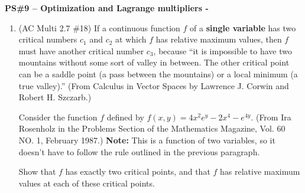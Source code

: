 \documentclass[10pt]{article}
\renewcommand{\section}[1]{\begin{center} \textbf{#1} \\\end{center}}
\begin{document}
%


\allowdisplaybreaks
\section{PS\#9 -- Optimization and Lagrange multipliers - \red{Answer key} }

\begin{enumerate}[leftmargin=0pt]
    
    \item (AC Multi 2.7 \#18) If a continuous function $f$ of a \textbf{single variable} has two critical numbers $c_1$ and $c_2$ at which $f$ has relative maximum values, then $f$ must have another critical number $c_3$, because ``it is impossible to have two mountains without some sort of valley in between. The other critical point can be a saddle point (a pass between the mountains) or a local minimum (a true valley).'' (From Calculus in Vector Spaces by Lawrence J. Corwin and Robert H. Szczarb.)
    
    Consider the function $f$ defined by $f(x,y) = 4x^2e^y -2x^4 -e^{4y}.$ (From Ira Rosenholz in the Problems Section of the Mathematics Magazine, Vol. 60 NO. 1, February 1987.) \textbf{Note:} This is a function of two variables, so it doesn't have to follow the rule outlined in the previous paragraph.
    
    Show that $f$ has exactly two critical points, and that $f$ has relative maximum values at each of these critical points. 
    

\end{enumerate}
\end{document}
